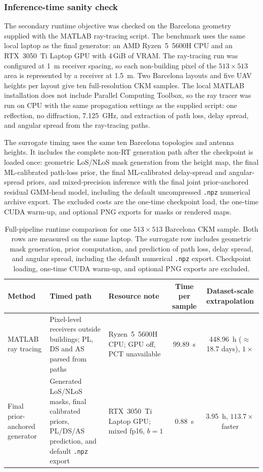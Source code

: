 \subsubsection*{Inference-time sanity check}

The secondary runtime objective was checked on the Barcelona geometry supplied
with the MATLAB ray-tracing script. The benchmark uses the same local laptop as
the final generator: an AMD Ryzen~5~5600H CPU and an RTX~3050~Ti Laptop GPU
with 4\,GiB of VRAM. The ray-tracing run was configured at
\SI{1}{m} receiver spacing, so each non-building pixel of the \(513\times513\)
area is represented by a receiver at \SI{1.5}{m}. Two Barcelona layouts and five
UAV heights per layout give ten full-resolution CKM samples. The local MATLAB
installation does not include Parallel Computing Toolbox, so the ray tracer was
run on CPU with the same propagation settings as the supplied script:
one reflection, no diffraction, \SI{7.125}{GHz}, and extraction of path loss,
delay spread, and angular spread from the ray-tracing paths.

The surrogate timing uses the same ten Barcelona topologies and antenna
heights. It includes the complete non-RT generation path after the checkpoint is
loaded once: geometric LoS/NLoS mask generation from the height map, the final
ML-calibrated path-loss prior, the final ML-calibrated delay-spread and
angular-spread priors, and mixed-precision inference with the final joint
prior-anchored residual GMM-head model, including the default uncompressed
\texttt{.npz} numerical archive export. The excluded costs are the one-time
checkpoint load, the one-time CUDA warm-up, and optional PNG exports for masks
or rendered maps.

\begin{table}[H]
\centering
\caption[Full-pipeline runtime and ray-tracing comparison.]
{Full-pipeline runtime comparison for one \(513\times513\) Barcelona CKM sample.
Both rows are measured on the same laptop. The surrogate row includes geometric
mask generation, prior computation, and prediction of path loss, delay spread,
and angular spread, including the default numerical \texttt{.npz} export.
Checkpoint loading, one-time CUDA warm-up, and optional PNG exports are
excluded.}
\label{tab:inference_time_comparison}
\scriptsize
\begin{tabularx}{\textwidth}{>{\raggedright\arraybackslash}p{2.35cm}>{\raggedright\arraybackslash}X>{\raggedright\arraybackslash}p{2.25cm}cc}
\toprule
Method & Timed path & Resource note & Time per sample & Dataset-scale extrapolation \\
\midrule
MATLAB ray tracing & Pixel-level receivers outside buildings; PL, DS and AS parsed from paths & Ryzen~5~5600H CPU; GPU off, PCT unavailable & \SI{99.89}{s} & \SI{448.96}{h} (\(\approx\)18.7 days), \(1\times\) \\
Final prior-anchored generator & Generated LoS/NLoS masks, final calibrated priors, PL/DS/AS prediction, and default \texttt{.npz} export & RTX~3050~Ti Laptop GPU; mixed fp16, \(b=1\) & \SI{0.88}{s} & \SI{3.95}{h}, \(113.7\times\) faster \\
\bottomrule
\end{tabularx}
\end{table}
\normalsize

